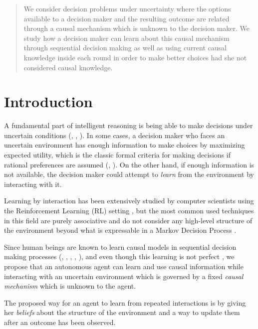 \documentclass{article}
\begin{document}
\begin{abstract}
We consider decision problems under uncertainty where the options available to a decision maker and the resulting outcome are related through a causal mechanism which is unknown to the decision maker. We study how a decision maker can learn about this causal mechanism through sequential decision making as well as using current causal knowledge inside each round in order to make better choices had she not considered causal knowledge. 
\end{abstract}

\section{Introduction}
A fundamental part of intelligent reasoning is being able to make decisions under uncertain conditions (\cite{danks2014unifying}, \cite{lake2017building}, \cite{pearlwhy}). In some cases, a decision maker who faces an uncertain environment has enough information to make choices by maximizing expected utility, which is the classic formal criteria for making decisions if rational preferences are assumed (\cite{bernardo2000bayesian}, \cite{gilboa2009decision}). On the other hand, if enough information is not available, the decision maker could attempt to \textit{learn} from the environment by interacting with it.

Learning by interaction has been extensively studied by computer scientists using the Reinforcement Learning (RL) setting \cite{sutton1998reinforcement}, but the most common used techniques  in this field are purely associative and do not consider any high-level structure of the environment beyond what is expressable in a Markov Decision Process \cite{garnelo2016towards}.

Since human beings are known to learn causal models in sequential decision making processes (\cite{sloman2006causal}, \cite{nichols2007decision}, \cite{meder2010observing}, \cite{hagmayer2013repeated}, \cite{danks2014unifying}), and even though this learning is not perfect \cite{rottman2014reasoning}, we propose that an autonomous agent can learn and use causal information while interacting with an uncertain environment which is governed by a fixed \textit{causal mechanism} which is unknown to the agent.  

The proposed way for an agent to learn from repeated interactions is by giving her \textit{beliefs} about the structure of the environment and a way to update them after an outcome has been observed.
\end{document}
